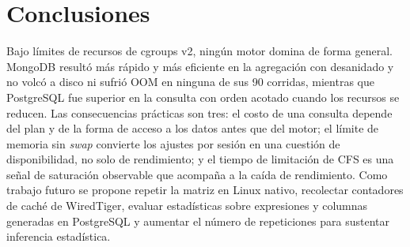 \documentclass[12pt,letterpaper]{article}
\newcommand{\Mongo}{MongoDB}
\newcommand{\PG}{PostgreSQL}
\begin{document}
\section{Conclusiones}
Bajo límites de recursos de cgroups v2, ningún motor domina de forma general. \Mongo{} resultó más rápido y más eficiente en la agregación con desanidado y no volcó a disco ni sufrió OOM en ninguna de sus 90 corridas, mientras que \PG{} fue superior en la consulta con orden acotado cuando los recursos se reducen. Las consecuencias
prácticas son tres: el costo de una consulta depende del plan y de la forma de acceso a los datos antes que del motor; el límite de memoria sin \textit{swap} convierte los ajustes por sesión en una cuestión de disponibilidad, no solo de rendimiento; y el tiempo de limitación de CFS es una señal de saturación observable que acompaña a
la caída de rendimiento. Como trabajo futuro se propone repetir la matriz en Linux nativo, recolectar contadores de caché de WiredTiger, evaluar estadísticas sobre expresiones y columnas generadas en \PG{} y aumentar el número de repeticiones para sustentar inferencia estadística.

\clearpage
\end{document}
